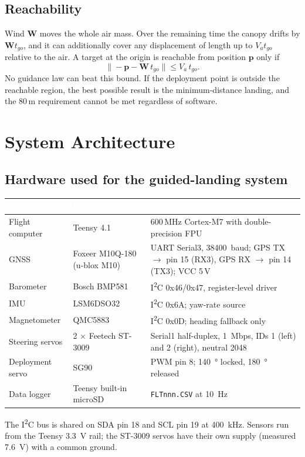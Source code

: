 \documentclass[11pt,a4paper]{article}
\newcommand{\hdr}[1]{\textcolor{white}{\textbf{#1}}}
\newcommand{\code}[1]{\texttt{#1}}
\newcommand{\vect}[1]{\mathbf{#1}}
\begin{document}
\subsection{Reachability}
Wind $\vect W$ moves the whole air mass. Over the remaining time the canopy
drifts by $\vect W t_{go}$, and it can additionally cover any displacement of
length up to $V_a t_{go}$ relative to the air. A target at the origin is
reachable from position $\vect p$ only if
\begin{equation}
  \bigl\lVert -\vect p - \vect W\, t_{go} \bigr\rVert \le V_a\, t_{go}.
  \label{eq:reach}
\end{equation}
No guidance law can beat this bound. If the deployment point is outside the
reachable region, the best possible result is the minimum-distance landing,
and the 80\,m requirement cannot be met regardless of software.

\section{System Architecture}

\subsection{Hardware used for the guided-landing system}
\begin{center}
\small
\renewcommand{\arraystretch}{1.2}
\begin{tabularx}{\linewidth}{p{3.3cm}p{3.6cm}Y}
\toprule
{}\hdr{Function} & \hdr{Device} & \hdr{Interface and notes} \\
\midrule
Flight computer & Teensy 4.1 & 600\,MHz Cortex-M7 with double-precision FPU \\
GNSS & Foxeer M10Q-180 (u-blox M10) & UART Serial3, \SI{38400}{baud}; GPS TX $\to$ pin 15 (RX3), GPS RX $\to$ pin 14 (TX3); VCC 5\,V \\
Barometer & Bosch BMP581 & I\textsuperscript{2}C 0x46/0x47, register-level driver \\
IMU & LSM6DSO32 & I\textsuperscript{2}C 0x6A; yaw-rate source \\
Magnetometer & QMC5883 & I\textsuperscript{2}C 0x0D; heading fallback only \\
Steering servos & 2 $\times$ Feetech ST-3009 & Serial1 half-duplex, \SI{1}{Mbps}, IDs 1 (left) and 2 (right), neutral 2048 \\
Deployment servo & SG90 & PWM pin 8; \SI{140}{\degree} locked, \SI{180}{\degree} released \\
Data logger & Teensy built-in microSD & \code{FLTnnn.CSV} at \SI{10}{\hertz} \\
\bottomrule
\end{tabularx}
\end{center}
\noindent The I\textsuperscript{2}C bus is shared on SDA pin 18 and SCL pin 19 at
\SI{400}{\kilo\hertz}. Sensors run from the Teensy \SI{3.3}{\volt} rail; the
ST-3009 servos have their own supply (measured \SI{7.6}{\volt}) with a common
ground.
\end{document}
